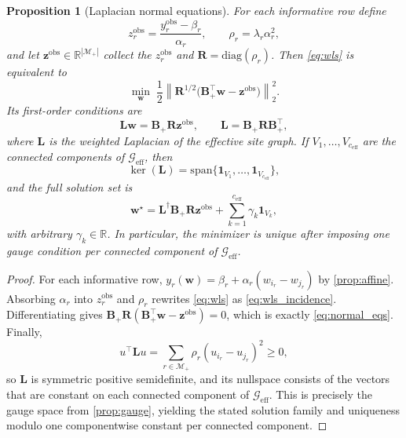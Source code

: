 \documentclass[preprint,12pt]{elsarticle}
\newtheorem{proposition}{Proposition}
\newcommand{\R}{\mathbb{R}}
\newcommand{\weights}{\mathbf{w}}
\newcommand{\rowset}{\mathcal{M}}
\newcommand{\effgraph}{\mathcal{G}_{\mathrm{eff}}}
\newcommand{\inc}{\mathbf{B}}
\newcommand{\lap}{\mathbf{L}}
\begin{document}
\begin{proposition}[Laplacian normal equations]
\label{prop:laplacian}
For each informative row define
\begin{equation}
    z_r^{\mathrm{obs}}=\frac{y_r^{\mathrm{obs}}-\beta_r}{\alpha_r},
    \qquad
    \rho_r=\lambda_r\alpha_r^2,
\end{equation}
and let $\mathbf{z}^{\mathrm{obs}}\in\R^{|\rowset_+|}$ collect the
$z_r^{\mathrm{obs}}$ and $\mathbf{R}=\mathrm{diag}(\rho_r)$. Then
\eqref{eq:wls} is equivalent to
\begin{equation}
    \min_{\weights}\;
    \frac12 \left\|
        \mathbf{R}^{1/2}\bigl(\inc_+^\top\weights-\mathbf{z}^{\mathrm{obs}}\bigr)
    \right\|_2^2.
    \label{eq:wls_incidence}
\end{equation}
Its first-order conditions are
\begin{equation}
    \lap \weights = \inc_+ \mathbf{R}\mathbf{z}^{\mathrm{obs}},
    \qquad
    \lap = \inc_+ \mathbf{R}\inc_+^\top,
    \label{eq:normal_eqs}
\end{equation}
where $\lap$ is the weighted Laplacian of the effective site graph. If
$V_1,\dots,V_{c_{\mathrm{eff}}}$ are the connected components of $\effgraph$,
then
\begin{equation}
    \ker(\lap)=\mathrm{span}\{\mathbf{1}_{V_1},\dots,\mathbf{1}_{V_{c_{\mathrm{eff}}}}\},
\end{equation}
and the full solution set is
\begin{equation}
    \weights^\star = \lap^\dagger \inc_+ \mathbf{R}\mathbf{z}^{\mathrm{obs}}
    + \sum_{k=1}^{c_{\mathrm{eff}}}\gamma_k \mathbf{1}_{V_k},
\end{equation}
with arbitrary $\gamma_k\in\R$. In particular, the minimizer is unique after
imposing one gauge condition per connected component of $\effgraph$.
\end{proposition}

\begin{proof}
For each informative row,
$y_r(\weights)=\beta_r+\alpha_r(w_{i_r}-w_{j_r})$ by
\cref{prop:affine}. Absorbing $\alpha_r$ into
$z_r^{\mathrm{obs}}$ and $\rho_r$ rewrites \eqref{eq:wls} as
\eqref{eq:wls_incidence}. Differentiating gives
$\inc_+\mathbf{R}(\inc_+^\top\weights-\mathbf{z}^{\mathrm{obs}})=0$, which is
exactly \eqref{eq:normal_eqs}. Finally,
\begin{equation}
    u^\top\lap u = \sum_{r\in\rowset_+}\rho_r(u_{i_r}-u_{j_r})^2 \ge 0,
\end{equation}
so $\lap$ is symmetric positive semidefinite, and its nullspace consists of the
vectors that are constant on each connected component of $\effgraph$. This is
precisely the gauge space from \cref{prop:gauge}, yielding the stated solution
family and uniqueness modulo one componentwise constant per connected
component.
\end{proof}
\end{document}
